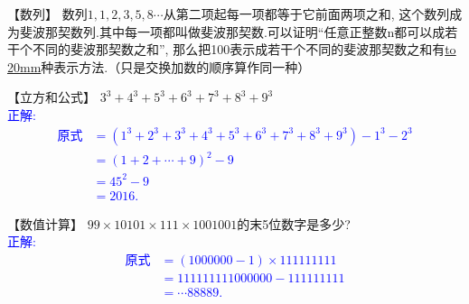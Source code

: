 \item {
    【数列】
    数列$1, 1,2,3,5,8\cdots$从第二项起每一项都等于它前面两项之和, 这个数列成为斐波那契数列.其中每一项都叫做斐波那契数.可以证明``任意正整数n都可以成若干个不同的斐波那契数之和'', 那么把100表示成若干个不同的斐波那契数之和有\underline{\hbox to 20mm{}}种表示方法.（只是交换加数的顺序算作同一种）  
}

\item {
    【立方和公式】
    $3^3 + 4^3 + 5^3 + 6^3 + 7^3 + 8^3 + 9^3$
    \ifshowSolution
        \\\fangsong{}\textcolor{blue}{
            正解:
            \begin{align*}
                \mbox{原式} &= (1^3 + 2^3 + 3^3 + 4^3 + 5^3 + 6^3 + 7^3 + 8^3 + 9^3) - 1^3 - 2^3 \\
                &= (1 + 2 +\cdots + 9)^2 - 9 \\
                &= 45^2 - 9 \\
                &= 2016.
            \end{align*}
        }
    \else
        \vspace{1cm}
    \fi
}

\item {
    【数值计算】
    $99\times 10101\times 111\times 1001001$的末5位数字是多少?
    \ifshowSolution
        \\\fangsong{}\textcolor{blue}{
            正解:
            \begin{align*}
                \mbox{原式} &= (1000000-1)\times 111111111 \\
                &= 111111111000000- 111111111 \\
                &= \cdots 88889.
            \end{align*}
        }
    \else
        \vspace{1cm}
    \fi
}


